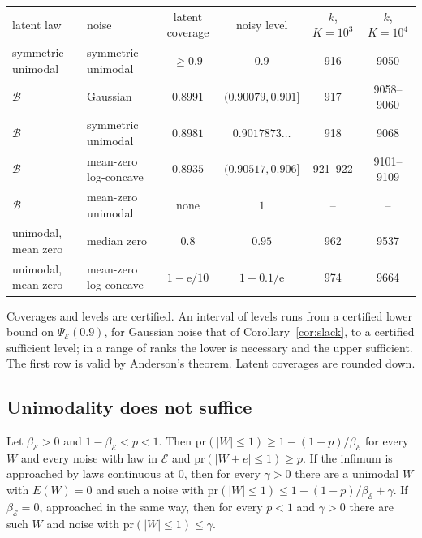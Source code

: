 \documentclass[lineno]{biometrika}
\newcommand{\pr}{\mathrm{pr}}
\begin{document}
\begin{table}
{\begin{tabular}{llcccc}
latent law & noise & latent coverage & noisy level & $k$, $K = 10^3$ & $k$, $K = 10^4$ \\
symmetric unimodal & symmetric unimodal & $\ge 0.9$ & $0.9$ & 916 & 9050 \\
$\mathcal B$ & Gaussian & $0.8991$ & $(0.90079, 0.901]$ & 917 & 9058--9060 \\
$\mathcal B$ & symmetric unimodal & $0.8981$ & $0.9017873\ldots$ & 918 & 9068 \\
$\mathcal B$ & mean-zero log-concave & $0.8935$ & $(0.90517, 0.906]$ & 921--922 & 9101--9109 \\
$\mathcal B$ & mean-zero unimodal & none & $1$ & -- & -- \\
unimodal, mean zero & median zero & $0.8$ & $0.95$ & 962 & 9537 \\
unimodal, mean zero & mean-zero log-concave & $1 - \mathrm{e}/10$ & $1 - 0.1/\mathrm{e}$ & 974 & 9664 \\
\end{tabular}}
\label{tab:map}
\begin{tabnote}
Coverages and levels are certified. An interval of levels runs from a certified lower bound on $\Psi_{\mathcal E}(0.9)$, for Gaussian noise that of Corollary~\ref{cor:slack}, to a certified sufficient level; in a range of ranks the lower is necessary and the upper sufficient. The first row is valid by Anderson's theorem. Latent coverages are rounded down.
\end{tabnote}
\end{table}

\subsection{Unimodality does not suffice}

\begin{proposition}\label{prop:latentshape}
Let $\beta_{\mathcal E} > 0$ and $1 - \beta_{\mathcal E} < p < 1$. Then $\pr(|W| \le 1) \ge 1 - (1 - p)/\beta_{\mathcal E}$ for every $W$ and every noise with law in $\mathcal E$ and $\pr(|W + e| \le 1) \ge p$. If the infimum is approached by laws continuous at $0$, then for every $\gamma > 0$ there are a unimodal $W$ with $E(W) = 0$ and such a noise with $\pr(|W| \le 1) \le 1 - (1 - p)/\beta_{\mathcal E} + \gamma$. If $\beta_{\mathcal E} = 0$, approached in the same way, then for every $p < 1$ and $\gamma > 0$ there are such $W$ and noise with $\pr(|W| \le 1) \le \gamma$.
\end{proposition}
\end{document}
